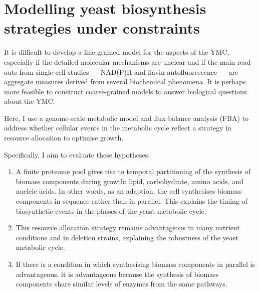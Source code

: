 \chapter{Modelling yeast biosynthesis strategies under constraints}
\label{ch:model}

It is difficult to develop a fine-grained model for the aspects of the YMC,
especially if the detailed molecular mechanisms are unclear
and if the main read-outs from single-cell studies --- NAD(P)H and flavin autofluorescence --- are aggregate measures derived from several biochemical phenomena.
It is perhaps more feasible to construct coarse-grained models to answer biological questions about the YMC.

Here, I use a genome-scale metabolic model and flux balance analysis (FBA) to address whether cellular events in the metabolic cycle reflect a strategy in resource allocation to optimise growth.

Specifically, I aim to evaluate these hypotheses:
\begin{enumerate}
  \item A finite proteome pool gives rise to temporal partitioning of the synthesis of biomass components during growth: lipid, carbohydrate, amino acids, and nucleic acids.
        In other words, as an adaption, the cell synthesises biomass components in sequence rather than in parallel.
        This explains the timing of biosynthetic events in the phases of the yeast metabolic cycle.
  \item This resource allocation strategy remains advantageous in many nutrient conditions and in deletion strains, explaining the robustness of the yeast metabolic cycle.
  \item If there is a condition in which synthesising biomass components in parallel is advantageous, it is advantageous because the synthesis of biomass components share similar levels of enzymes from the same pathways.
\end{enumerate}


